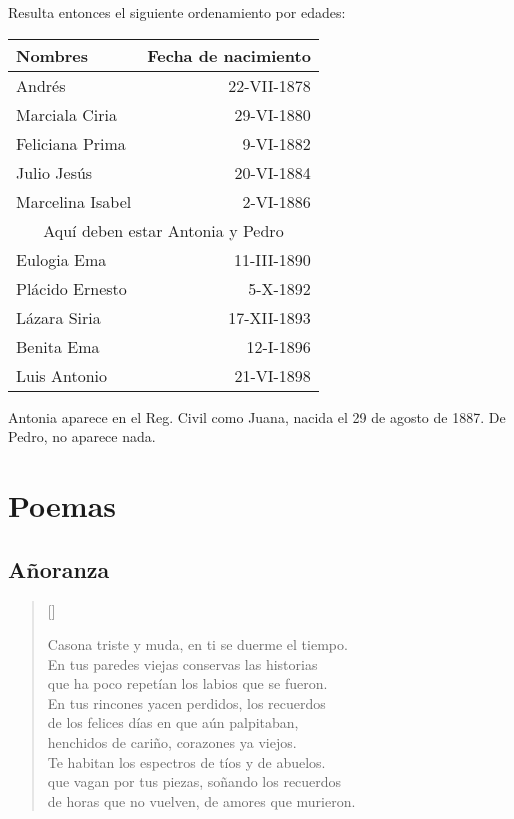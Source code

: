 \documentclass[a4paper]{article}
\begin{document}
Resulta entonces el siguiente ordenamiento por edades:

\begin{table}[htb]
    \centering
    \begin{tabular}{l r}
        Nombres & Fecha de nacimiento\\
        \midrule
        Andrés & 22-VII-1878\\
        Marciala Ciria & 29-VI-1880\\
        Feliciana Prima & 9-VI-1882\\
        Julio Jesús & 20-VI-1884\\
        Marcelina Isabel & 2-VI-1886\\
        \multicolumn{2}{c}{Aquí deben estar Antonia y Pedro}\\
        Eulogia Ema & 11-III-1890\\
        Plácido Ernesto & 5-X-1892\\
        Lázara Siria & 17-XII-1893\\
        Benita Ema & 12-I-1896\\
        Luis Antonio & 21-VI-1898\\
    \end{tabular}
\end{table}

Antonia aparece en el Reg. Civil como Juana, nacida el 29 de agosto de 1887. De Pedro, no aparece nada.

\newpage{}

\section{Poemas}

\subsection{Añoranza}

\begin{verse}[\textwidth]

Casona triste y muda, en ti se duerme el tiempo.\\
En tus paredes viejas conservas las historias\\
que ha poco repetían los labios que se fueron.\\
En tus rincones yacen perdidos, los recuerdos\\
de los felices días en que aún palpitaban,\\
henchidos de cariño, corazones ya viejos.\\
Te habitan los espectros de tíos y de abuelos.\\
que vagan por tus piezas, soñando los recuerdos\\
de horas que no vuelven, de amores que murieron.

\end{verse}
\end{document}

